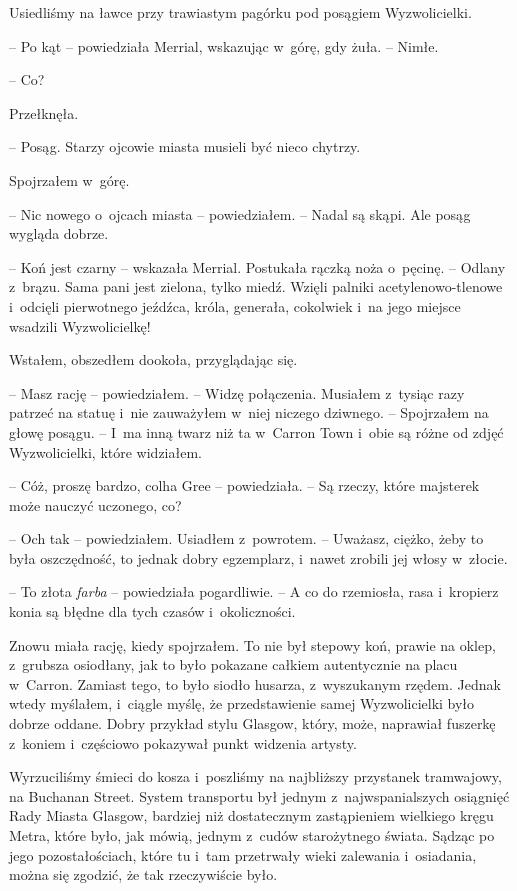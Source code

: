 \documentclass[oneside,polish,11pt,sfheadings]{mwbk}
\begin{document}
Usiedliśmy na ławce przy trawiastym pagórku pod posągiem Wyzwolicielki.

-- Po kąt -- powiedziała Merrial, wskazując w~górę, gdy żuła. -- Nimłe.

-- Co?

Przełknęła. 

-- Posąg. Starzy ojcowie miasta musieli być nieco chytrzy.

Spojrzałem w~górę. 

-- Nic nowego o~ojcach miasta -- powiedziałem. -- Nadal
są skąpi. Ale posąg wygląda dobrze.

-- Koń jest czarny -- wskazała Merrial. Postukała rączką noża o~pęcinę. -- Odlany z~brązu. Sama pani jest zielona, tylko miedź. Wzięli palniki
acetylenowo-tlenowe i~odcięli pierwotnego jeźdźca, króla, generała,
cokolwiek i~na jego miejsce wsadzili Wyzwolicielkę!

Wstałem, obszedłem dookoła, przyglądając się.

-- Masz rację -- powiedziałem. -- Widzę połączenia. Musiałem z~tysiąc razy
patrzeć na statuę i~nie zauważyłem w~niej niczego dziwnego. -- Spojrzałem
na głowę posągu. -- I~ma inną twarz niż ta w~Carron Town i~obie są różne
od zdjęć Wyzwolicielki, które widziałem.

-- Cóż, proszę bardzo, colha Gree -- powiedziała. -- Są rzeczy, które
majsterek może nauczyć uczonego, co?

-- Och tak -- powiedziałem. Usiadłem z~powrotem. -- Uważasz, ciężko, żeby
to była oszczędność, to jednak dobry egzemplarz, i~nawet zrobili jej
włosy w~złocie.

-- To złota \textit{farba} -- powiedziała pogardliwie. -- A co do rzemiosła,
rasa i~kropierz konia są błędne dla tych czasów i~okoliczności.

Znowu miała rację, kiedy spojrzałem. To nie był stepowy koń, prawie na
oklep, z~grubsza osiodłany, jak to było pokazane całkiem autentycznie na
placu w~Carron. Zamiast tego, to było siodło husarza, z~wyszukanym
rzędem. Jednak wtedy myślałem, i~ciągle myślę, że przedstawienie samej
Wyzwolicielki było dobrze oddane. Dobry przykład stylu Glasgow, który,
może, naprawiał fuszerkę z~koniem i~częściowo pokazywał punkt widzenia
artysty.

Wyrzuciliśmy śmieci do kosza i~poszliśmy na najbliższy przystanek
tramwajowy, na Buchanan Street. System transportu był jednym z~najwspanialszych osiągnięć Rady Miasta Glasgow, bardziej niż
dostatecznym zastąpieniem wielkiego kręgu Metra, które było, jak mówią,
jednym z~cudów starożytnego świata. Sądząc po jego pozostałościach,
które tu i~tam przetrwały wieki zalewania i~osiadania, można się
zgodzić, że tak rzeczywiście było.
\end{document}
